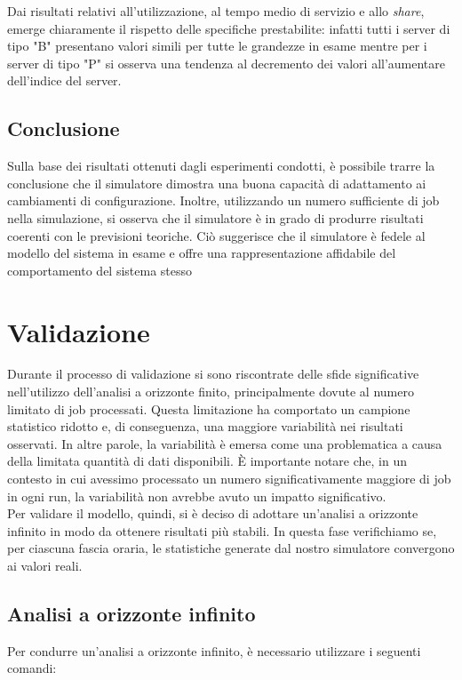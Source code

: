 \documentclass[a4paper, 12pt]{article}
\begin{document}
Dai risultati relativi all'utilizzazione, al tempo medio di servizio e allo \textit{share}, emerge chiaramente il rispetto delle specifiche prestabilite: infatti tutti i server di tipo "B" presentano valori simili per tutte le grandezze in esame mentre per i server di tipo "P" si osserva una tendenza al decremento dei valori all'aumentare dell'indice del server.

\subsection{Conclusione}

Sulla base dei risultati ottenuti dagli esperimenti condotti, è possibile trarre la conclusione che il simulatore dimostra una buona capacità di adattamento ai cambiamenti di configurazione. Inoltre, utilizzando un numero sufficiente di job nella simulazione, si osserva che il simulatore è in grado di produrre risultati coerenti con le previsioni teoriche. Ciò suggerisce che il simulatore è fedele al modello del sistema in esame e offre una rappresentazione affidabile del comportamento del sistema stesso


\section{Validazione}
Durante il processo di validazione si sono riscontrate delle sfide significative nell'utilizzo dell'analisi a orizzonte finito, principalmente dovute al numero limitato di job processati. Questa limitazione ha comportato un campione statistico ridotto e, di conseguenza, una maggiore variabilità nei risultati osservati. In altre parole, la variabilità è emersa come una problematica a causa della limitata quantità di dati disponibili. È importante notare che, in un contesto in cui avessimo processato un numero significativamente maggiore di job in ogni run, la variabilità non avrebbe avuto un impatto significativo. \\

Per validare il modello, quindi, si è deciso di adottare un'analisi a orizzonte infinito in modo da ottenere risultati più stabili. In questa fase verifichiamo se, per ciascuna fascia oraria, le statistiche generate dal nostro simulatore convergono ai valori reali. 

\subsection{Analisi a orizzonte infinito}
Per condurre un'analisi a orizzonte infinito, è necessario utilizzare i seguenti comandi:
\end{document}
